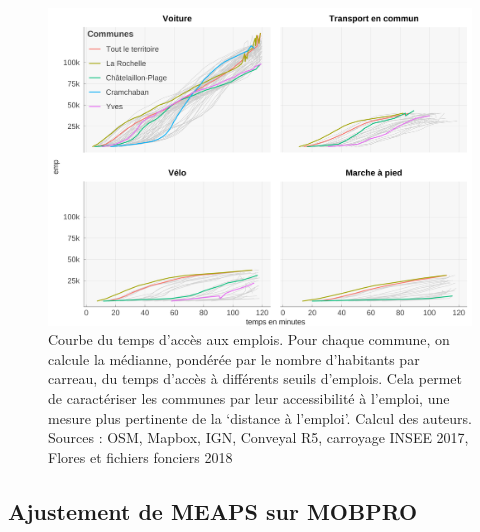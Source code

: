 \documentclass[
  10pt,
  a4paper,
  numbers=noendperiod,
  DIV=12]{scrartcl}
\begin{document}
\begin{figure}[htb]

{\centering \includegraphics[width=1\textwidth,height=\textheight]{output/access_par_com.png}

}

\caption[Accessibilité par communes pour la
Rochelle]{\label{fig-comaccess}Courbe du temps d'accès aux emplois. Pour
chaque commune, on calcule la médianne, pondérée par le nombre
d'habitants par carreau, du temps d'accès à différents seuils d'emplois.
Cela permet de caractériser les communes par leur accessibilité à
l'emploi, une mesure plus pertinente de la `distance à l'emploi'. Calcul
des auteurs. Sources : OSM, Mapbox, IGN, Conveyal R5, carroyage INSEE
2017, Flores et fichiers fonciers 2018}

\end{figure}

\hypertarget{ajustement-de-meaps-sur-mobpro}{%
\subsection{Ajustement de MEAPS sur
MOBPRO}\label{ajustement-de-meaps-sur-mobpro}}
\end{document}
